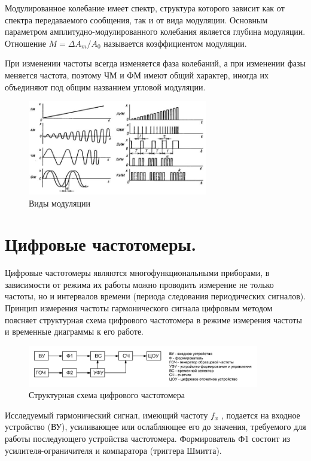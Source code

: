 \documentclass[unicode, 12pt, a4paper, oneside]{article}
\begin{document}
Модулированное колебание имеет спектр, структура которого зависит как от спектра передаваемого сообщения, так и от вида модуляции. Основным параметром амплитудно-модулированного колебания является глубина модуляции. Отношение $M=\Delta A_m/A_0$ называется коэффициентом модуляции.

При изменении частоты всегда изменяется фаза колебаний, а при изменении фазы меняется частота, поэтому ЧМ и ФМ имеют общий характер, иногда их объединяют под общим названием угловой модуляции.

\begin{figure}[H]
\centering
\includegraphics[width=0.7\textwidth]{52.jpg}
\caption{Виды модуляции}
\end{figure}

\section{Цифровые частотомеры.}

Цифровые частотомеры являются многофункциональными приборами, в зависимости от режима их работы можно проводить измерение не только частоты, но и интервалов времени (периода следования периодических сигналов). Принцип измерения частоты гармонического сигнала цифровым методом поясняет структурная схема цифрового частотомера в режиме измерения частоты и временные диаграммы к его работе.
\begin{figure}[H]
\centering
\includegraphics[width=0.9\textwidth]{53.jpg}
\caption{Структурная схема цифрового частотомера}
\end{figure}

Исследуемый гармонический сигнал, имеющий частоту $f_x$ , подается на входное устройство (ВУ), усиливающее или ослабляющее его до значения, требуемого для работы последующего устройства частотомера. Формирователь Ф1 состоит из усилителя-ограничителя и компаратора (триггера Шмитта).
\end{document}
